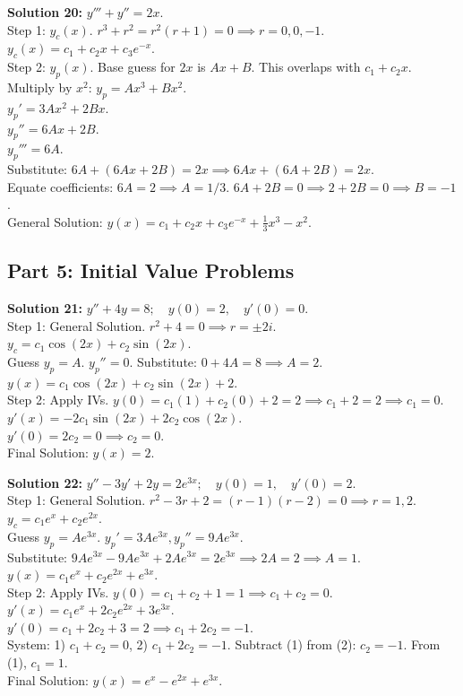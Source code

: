 \documentclass[11pt]{article}
\begin{document}
\textbf{Solution 20:} $y''' + y'' = 2x$. \\
Step 1: $y_c(x)$. $r^3 + r^2 = r^2(r+1) = 0 \implies r = 0, 0, -1$. $y_c(x) = c_1 + c_2 x + c_3 e^{-x}$. \\
Step 2: $y_p(x)$. Base guess for $2x$ is $Ax + B$. This overlaps with $c_1 + c_2 x$. Multiply by $x^2$: $y_p = A x^3 + B x^2$. \\
$y_p' = 3A x^2 + 2B x$. \\
$y_p'' = 6A x + 2B$. \\
$y_p''' = 6A$. \\
Substitute: $6A + (6A x + 2B) = 2x \implies 6A x + (6A + 2B) = 2x$. \\
Equate coefficients: $6A = 2 \implies A = 1/3$. $6A + 2B = 0 \implies 2 + 2B = 0 \implies B = -1$. \\
General Solution: $y(x) = c_1 + c_2 x + c_3 e^{-x} + \frac{1}{3}x^3 - x^2$.

\subsection*{Part 5: Initial Value Problems}

\textbf{Solution 21:} $y'' + 4y = 8; \quad y(0) = 2, \quad y'(0) = 0$. \\
Step 1: General Solution. $r^2 + 4 = 0 \implies r = \pm 2i$. $y_c = c_1 \cos(2x) + c_2 \sin(2x)$. \\
Guess $y_p = A$. $y_p'' = 0$. Substitute: $0 + 4A = 8 \implies A = 2$. \\
$y(x) = c_1 \cos(2x) + c_2 \sin(2x) + 2$. \\
Step 2: Apply IVs. $y(0) = c_1(1) + c_2(0) + 2 = 2 \implies c_1 + 2 = 2 \implies c_1 = 0$. \\
$y'(x) = -2c_1 \sin(2x) + 2c_2 \cos(2x)$. \\
$y'(0) = 2c_2 = 0 \implies c_2 = 0$. \\
Final Solution: $y(x) = 2$.

\textbf{Solution 22:} $y'' - 3y' + 2y = 2e^{3x}; \quad y(0) = 1, \quad y'(0) = 2$. \\
Step 1: General Solution. $r^2 - 3r + 2 = (r-1)(r-2) = 0 \implies r=1, 2$. $y_c = c_1 e^x + c_2 e^{2x}$. \\
Guess $y_p = A e^{3x}$. $y_p' = 3A e^{3x}, y_p'' = 9A e^{3x}$. \\
Substitute: $9A e^{3x} - 9A e^{3x} + 2A e^{3x} = 2e^{3x} \implies 2A = 2 \implies A = 1$. \\
$y(x) = c_1 e^x + c_2 e^{2x} + e^{3x}$. \\
Step 2: Apply IVs. $y(0) = c_1 + c_2 + 1 = 1 \implies c_1 + c_2 = 0$. \\
$y'(x) = c_1 e^x + 2c_2 e^{2x} + 3e^{3x}$. \\
$y'(0) = c_1 + 2c_2 + 3 = 2 \implies c_1 + 2c_2 = -1$. \\
System: 1) $c_1 + c_2 = 0$, 2) $c_1 + 2c_2 = -1$. Subtract (1) from (2): $c_2 = -1$. From (1), $c_1 = 1$. \\
Final Solution: $y(x) = e^x - e^{2x} + e^{3x}$.
\end{document}
